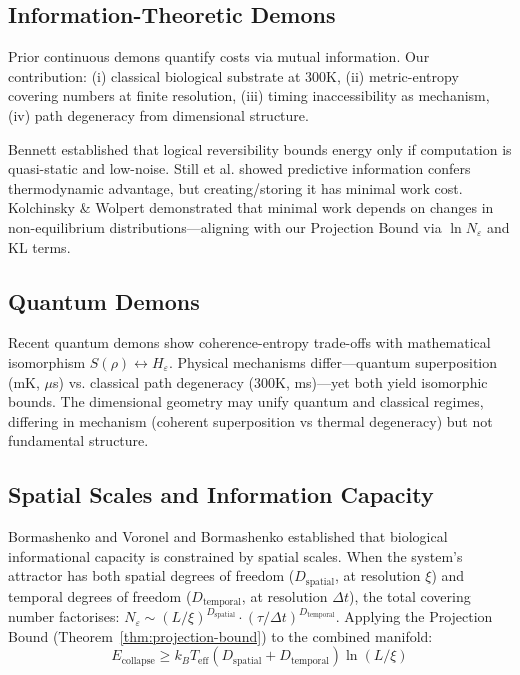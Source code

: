 \documentclass[12pt]{article}
\numberwithin{equation}{section}
\begin{document}
\subsection{Information-Theoretic Demons}

Prior continuous demons \cite{parrondo1996,vaikuntanathan2009,allahverdyan2009} quantify costs via mutual information. Our contribution: (i) classical biological substrate at 300K, (ii) metric-entropy covering numbers at finite resolution, (iii) timing inaccessibility as mechanism, (iv) path degeneracy from dimensional structure.

Bennett \cite{bennett1982} established that logical reversibility bounds energy only if computation is quasi-static and low-noise. Still et al. \cite{still2012} showed predictive information confers thermodynamic advantage, but creating/storing it has minimal work cost. Kolchinsky \& Wolpert \cite{kolchinsky2018} demonstrated that minimal work depends on changes in non-equilibrium distributions—aligning with our Projection Bound via $\ln N_\varepsilon$ and KL terms.

\subsection{Quantum Demons}

Recent quantum demons \cite{PhysRevResearch2024,PhysRevA2016} show coherence-entropy trade-offs with mathematical isomorphism $S(\rho) \leftrightarrow H_\varepsilon$. Physical mechanisms differ—quantum superposition (mK, $\mu$s) vs. classical path degeneracy (300K, ms)—yet both yield isomorphic bounds. The dimensional geometry may unify quantum and classical regimes, differing in mechanism (coherent superposition vs thermal degeneracy) but not fundamental structure.

\subsection{Spatial Scales and Information Capacity}

Bormashenko and Voronel \cite{voronel2018} and Bormashenko \cite{bormashenko2022} established that biological informational capacity is constrained by spatial scales. When the system's attractor has both spatial degrees of freedom ($D_{\text{spatial}}$, at resolution $\xi$) and temporal degrees of freedom ($D_{\text{temporal}}$, at resolution $\Delta t$), the total covering number factorises: $N_\varepsilon \sim (L/\xi)^{D_{\text{spatial}}} \cdot (\tau/\Delta t)^{D_{\text{temporal}}}$. Applying the Projection Bound (Theorem~\ref{thm:projection-bound}) to the combined manifold:
\begin{equation}
E_{\text{collapse}} \geq k_BT_{\text{eff}} (D_{\text{spatial}} + D_{\text{temporal}}) \ln(L/\xi)
\end{equation}
\end{document}
